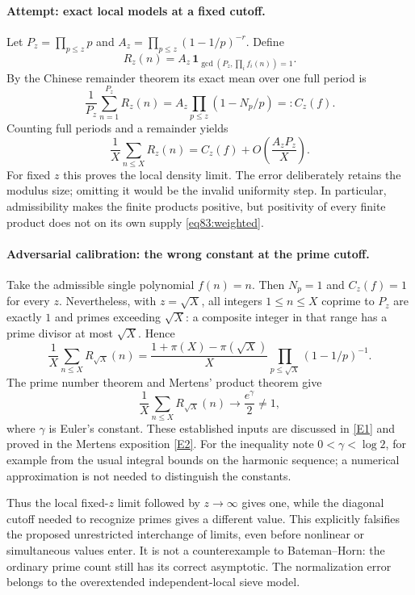 \documentclass[11pt,a4paper]{article}
\numberwithin{equation}{section}
\newcommand{\eref}[2]{\hyperlink{extra:#1:#2}{[E#2]}}
\begin{document}
\paragraph{Attempt: exact local models at a fixed cutoff.}
Let $P_z=\prod_{p\leq z}p$ and
$A_z=\prod_{p\leq z}(1-1/p)^{-r}$. Define
\[
 R_z(n)=A_z\,\mathbf1_{\gcd(P_z,\prod_i f_i(n))=1}.
\]
By the Chinese remainder theorem its exact mean over one full period is
\begin{equation}\label{eq83:local}
 \frac1{P_z}\sum_{n=1}^{P_z}R_z(n)
 =A_z\prod_{p\leq z}(1-N_p/p)=:C_z(f).
\end{equation}
Counting full periods and a remainder yields
\begin{equation}\label{eq83:error}
 \frac1X\sum_{n\leq X}R_z(n)
       =C_z(f)+O\left(\frac{A_z P_z}{X}\right).
\end{equation}
For fixed $z$ this proves the local density limit. The error deliberately
retains the modulus size; omitting it would be the invalid uniformity
step. In particular, admissibility makes the finite products positive,
but positivity of every finite product does not on its own supply
\eqref{eq83:weighted}.

\paragraph{Adversarial calibration: the wrong constant at the prime cutoff.}
Take the admissible single polynomial $f(n)=n$. Then $N_p=1$ and
$C_z(f)=1$ for every $z$. Nevertheless, with $z=\sqrt X$, all integers
$1\leq n\leq X$ coprime to $P_z$ are exactly $1$ and primes exceeding
$\sqrt X$: a composite integer in that range has a prime divisor at most
$\sqrt X$. Hence
\[
 \frac1X\sum_{n\leq X}R_{\sqrt X}(n)
 =\frac{1+\pi(X)-\pi(\sqrt X)}X
           \prod_{p\leq\sqrt X}(1-1/p)^{-1}.
\]
The prime number theorem and Mertens' product theorem give
\begin{equation}\label{eq83:mismatch}
 \frac1X\sum_{n\leq X}R_{\sqrt X}(n)
       \longrightarrow\frac{e^\gamma}{2}\ne1,
\end{equation}
where $\gamma$ is Euler's constant. These established inputs are discussed
in \eref{83}{1} and proved in the Mertens exposition \eref{83}{2}.
For the inequality note $0<\gamma<\log2$, for example from the usual
integral bounds on the harmonic sequence; a numerical approximation is
not needed to distinguish the constants.

Thus the local fixed-$z$ limit followed by $z\to\infty$ gives one, while
the diagonal cutoff needed to recognize primes gives a different value.
This explicitly falsifies the proposed unrestricted interchange of limits,
even before nonlinear or simultaneous values enter. It is not a
counterexample to Bateman--Horn: the ordinary prime count still has its
correct asymptotic. The normalization error belongs to the overextended
independent-local sieve model.
\end{document}
